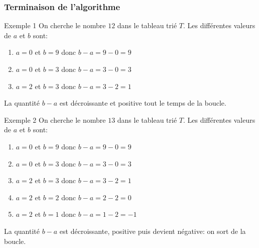\documentclass[9pt]{beamer}
\newcounter{num}
\begin{document}
\begin{frame}
\frametitle{Terminaison de l'algorithme}

\begin{exampleblock}{Exemple 1}
On cherche le nombre $12$ dans le tableau trié $T$. Les différentes valeurs de $a$ et $b$ sont:
\begin{enumerate}
\item $a=0$ et $b=9$ donc $b-a=9-0=\boxed{9}$
\item $a=0$ et $b=3$ donc $b-a=3-0=\boxed{3}$
\item $a=2$ et $b=3$ donc $b-a=3-2=\boxed{1}$
\end{enumerate}
La quantité $b-a$ est décroissante et positive tout le temps de la boucle.
\end{exampleblock}

\begin{exampleblock}{Exemple 2}
On cherche le nombre $13$ dans le tableau trié $T$. Les différentes valeurs de $a$ et $b$ sont:
\begin{enumerate}
\item $a=0$ et $b=9$ donc $b-a=9-0=\boxed{9}$
\item $a=0$ et $b=3$ donc $b-a=3-0=\boxed{3}$
\item $a=2$ et $b=3$ donc $b-a=3-2=\boxed{1}$
\item $a=2$ et $b=2$ donc $b-a=2-2=\boxed{0}$
\item $a=2$ et $b=1$ donc $b-a=1-2=\boxed{-1}$
\end{enumerate}
La quantité $b-a$ est décroissante, positive puis devient négative: on sort de la boucle.
\end{exampleblock}
\end{frame}
\end{document}
